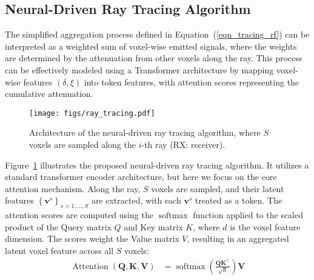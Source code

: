 \subsection{Neural-Driven Ray Tracing Algorithm}

The simplified aggregation process defined in Equation~(\ref{eqn_tracing_rf}) can be interpreted as a weighted sum of voxel-wise emitted signals, where the weights are determined by the attenuation from other voxels along the ray. 
This process can be effectively modeled using a Transformer architecture by mapping voxel-wise features $\left( \delta, \xi \right)$ into token features, with attention scores representing the cumulative attenuation.


\begin{figure}[t]
\centering
	{\texttt{[image: figs/ray\_tracing.pdf]}}
    \vspace{-0.1in}
\caption{Architecture of the neural-driven ray tracing algorithm, where \( S \) voxels are sampled along the \( i \)-th ray (RX: receiver).}
	\label{fig_tran_ray}
\end{figure}


Figure~\ref{fig_tran_ray} illustrates the proposed neural-driven ray tracing algorithm. 
It utilizes a standard transformer encoder architecture, but here we focus on the core attention mechanism. 
Along the ray, \( S \) voxels are sampled, and their latent features \( \left\{\mathbf{v}^s\right\}_{s=1, \dots, S} \) are extracted, with each \( \mathbf{v}^s \) treated as a token. 
The attention scores are computed using the \(\operatorname{softmax}\) function applied to the scaled product of the Query matrix \( Q \) and Key matrix \( K \), where \( d \) is the voxel feature dimension. 
The scores weight the Value matrix \( V \), resulting in an aggregated latent voxel feature across all \( S \) voxels:
\begin{equation}
\label{eqn_qkv}
\begin{aligned}
\operatorname{Attention}(\mathbf{Q}, \mathbf{K}, \mathbf{V}) &= \operatorname{softmax}\left(\frac{\mathbf{Q} \mathbf{K}^\top}{\sqrt{d}}\right) \mathbf{V}
\end{aligned}
\end{equation}


